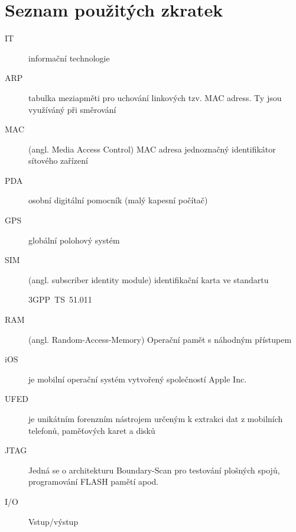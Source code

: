 \documentclass[thesis=B,czech]{FITthesis}[2012/06/26]
\begin{document}
\chapter{Seznam použitých zkratek}
\begin{description}

    \item[IT] informační technologie
    \item[ARP] tabulka meziapměti pro uchování linkových tzv. MAC adress. Ty jsou využíváný při směrování
    \item[MAC] (angl. Media Access Control) MAC adresa jednoznačný identifikátor sítového zařízení
    \item[PDA] osobní digitální pomocník (malý kapesní počítač)
   
    \item[GPS] globální polohový systém
    \item[SIM] (angl. subscriber identity module) identifikační karta ve standartu
    
     3GPP~TS~51.011
    \item[RAM] (angl. Random-Access-Memory) Operační pamět s náhodným přístupem
    \item[iOS] je mobilní operační systém vytvořený společností Apple Inc.
    \item[UFED] je unikátním forenzním nástrojem určeným k extrakci dat z mobilních telefonů, paměťových karet a disků
    \item[JTAG] Jedná se o architekturu Boundary-Scan pro testování plošných spojů, programování FLASH pamětí apod.
    \item[I/O] Vstup/výstup


\end{description}
\end{document}
